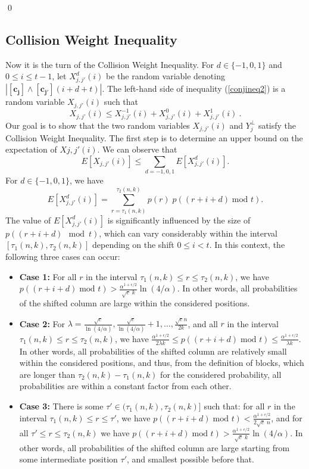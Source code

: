 \documentclass[11pt]{article}
\begin{document}
\qed

\subsection{Collision Weight Inequality}\label{CWIsub}
Now it is the turn of the Collision Weight Inequality.
For $d \in \{-1,0,1\}$ and $0 \le i \le t-1$, let $X^d_{j,j'}(i)$ be the random variable denoting 
$|\mathbf{[c_j]} \land \mathbf{[c_{j'}]}(i + d + t)|$.
The left-hand side of inequality (\ref{conjineq2}) is a random variable 
$X_{j,j'}(i)$ such that 
\begin{equation*}X_{j,j'}(i) \le X^{-1}_{j,j'}(i) + X^{0}_{j,j'}(i) + X^{1}_{j,j'}(i) 
\ .
\end{equation*}
Our goal is to show that the two random variables $X_{j,j'}(i)$ and $Y_j^{\perp}$ satisfy the
Collision Weight Inequality. The first step is to determine an upper bound on the expectation of 
$X{j,j'}(i)$. We can observe that
\[
      E[X_{j,j'}(i)] \le \sum_{d=-1,0,1} E[X^{d}_{j,j'}(i)] .
\]
For $d \in \{-1,0,1\}$, we have
\[
    	E[X^{d}_{j,j'}(i)] = \sum_{r=\tau_1(n,k)}^{\tau_2(n,k)} p(r)\; p\left((r+i+d)\; \text{mod } t\right) .
\]
The value of $E[X^{d}_{j,j'}(i)]$ is significantly influenced by the size of $p\left((r+i+d) \mod t\right)$, 
which can vary considerably within the interval $[\tau_1(n,k), \tau_2(n,k)]$ depending on the shift 
$0 \le i < t$.  
In this context, the following three cases can occur:

\begin{itemize}
    \item \textbf{Case 1:} For all $r$ in the interval $\tau_1(n,k) \leq r \leq \tau_2(n,k)$, we have 
$p((r+i+d)\; \text{mod } t) > \frac{\alpha^{1+\epsilon/2} }{\sqrt{c}\; k} \ln({4}/{\alpha})$.
{In other words, all probabilities of the shifted column are large within the considered positions.}
    \item \textbf{Case 2:} For $\lambda = \frac{\sqrt{c}}{\ln({4}/{\alpha})}, 
    \frac{\sqrt{c}}{\ln({4}/{\alpha})}+1 ,\ldots, 
    \frac{\sqrt{c} n}{2 k}$,
     and all $r$ in the interval $\tau_1(n,k) \leq r \leq \tau_2(n,k)$, we have 
  $\frac{\alpha^{1 + \epsilon/2} }{2\lambda k} \le p((r+i+d) \; \text{mod } t) 
  \le \frac{\alpha^{1+ \epsilon/2}  }{ \lambda k}$.
{In other words, all probabilities of the shifted column are relatively small within the considered positions, and thus, from the definition of blocks, which are longer than $\tau_2(n,k)-\tau_1(n,k)$ for the considered probability, all probabilities are within a constant factor from each other.}

    \item \textbf{Case 3:} There is some $\tau'\in (\tau_1(n,k),\tau_2(n,k)]$ such that: for all $r$ in the interval $\tau_1(n,k) \leq r \leq \tau'$, we have 
$p((r+i+d)\; \text{mod } t) < \frac{\alpha^{1+\epsilon/2} }{2\sqrt{c}\; n}$, and for all $\tau' \le r \le \tau_2(n,k)$ we have $p((r+i+d)\; \text{mod } t) > \frac{\alpha^{1+\epsilon/2} }{\sqrt{c}\; k} \ln({4}/{\alpha})$.
{In other words, all probabilities of the shifted column are large starting from some intermediate position $\tau'$, and smallest possible before that.}

\end{itemize}
\end{document}
